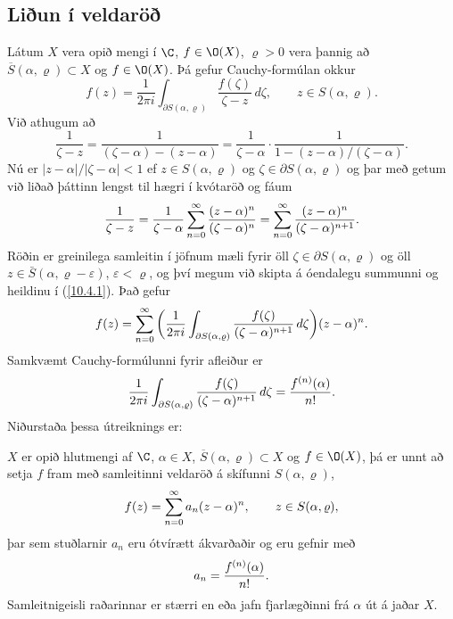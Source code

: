 \subsection*{Liðun í veldaröð}

Látum $X$ vera opið mengi í $\C$, $f\in \O(X)$, $\varrho>0$ vera
þannig að $\overline S(\alpha,\varrho)\subset X$
og $f\in\O(X)$.  Þá gefur
Cauchy-formúlan okkur
 \begin{equation*}f(z)=\dfrac 1{2\pi i}\int_{\partial S(\alpha,\varrho)}
\dfrac{f(\zeta)}{\zeta-z}\, d\zeta, \qquad z\in S(\alpha,\varrho).
\label{10.4.1}
 \end{equation*}
Við athugum að 
 $$\dfrac 1{\zeta-z}=\dfrac 1{(\zeta-\alpha)-(z-\alpha)}=
\dfrac 1{\zeta-\alpha}\cdot\dfrac 1{1-(z-\alpha)/(\zeta-\alpha)}.
 $$
Nú er $|z-\alpha|/|\zeta-\alpha|<1$ ef $z\in S(\alpha,\varrho)$ og
$\zeta\in\partial S(\alpha,\varrho)$ og þar með getum við liðað
þáttinn lengst til hægri í kvótaröð
og fáum
 \begin{equation*}\dfrac 1{\zeta-z}=\dfrac 1{\zeta-\alpha}\sum_{n=0}\sp \infty
\dfrac{(z-\alpha)\sp n}{(\zeta-\alpha)\sp n}=\sum_{n=0}\sp \infty
\dfrac{(z-\alpha)\sp n}{(\zeta-\alpha)\sp {n+1}}.\label{10.4.2}
 \end{equation*}
Röðin er greinilega samleitin í jöfnum mæli fyrir öll
$\zeta\in\partial S(\alpha,\varrho)$ og öll $z\in \bar
S(\alpha,\varrho-\varepsilon)$, $\varepsilon<\varrho$, og því megum
við skipta á óendalegu summunni og heildinu í (\ref{10.4.1}).
Það gefur
 $$
f(z)=\sum_{n=0}\sp \infty \bigg( \dfrac 1{2\pi i}
\int_{\partial S(\alpha,\varrho)}
\dfrac {f(\zeta)}{(\zeta-\alpha)\sp{n+1}}\, d\zeta\bigg)
(z-\alpha)\sp n.
 $$
Samkvæmt Cauchy-formúlunni fyrir afleiður er
 $$\dfrac 1{2\pi i}
\int_{\partial S(\alpha,\varrho)}
\dfrac {f(\zeta)}{(\zeta-\alpha)\sp{n+1}}\, d\zeta=
\dfrac{f\sp{(n)}(\alpha)}{n!}.
 $$
Niðurstaða þessa útreiknings er: 


\begin{se} $X$ er opið hlutmengi af $\C$, $\alpha\in X$,
$\overline S(\alpha,\varrho)\subset X$ og $f\in \O(X)$,
þá er unnt að setja  $f$ fram með samleitinni veldaröð
á skífunni $S(\alpha,\varrho)$,
 \begin{equation*}f(z)=\sum_{n=0}\sp \infty a_n(z-\alpha)\sp n,
\qquad z\in S(\alpha,\varrho),
\label{10.4.3}
 \end{equation*}
þar sem stuðlarnir $a_n$ eru ótvírætt ákvarðaðir og eru gefnir með 
 \begin{equation*}a_n=\dfrac {f\sp{(n)}(\alpha)}{n!}.\label{10.4.4}
 \end{equation*}
Samleitnigeisli raðarinnar er stærri en eða jafn fjarlægðinni
frá $\alpha$ út á  jaðar $X$.
\end{se}



